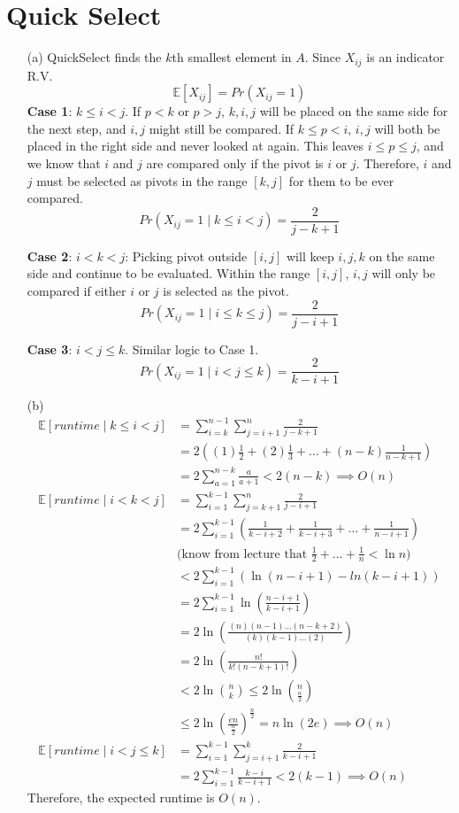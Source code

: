 \documentclass[11pt]{article}
\theoremstyle{definition}
\theoremstyle{remark}
\begin{document}
\section{Quick Select}
\begin{enumerate}
\item[(a)] QuickSelect finds the $k$th smallest element in $A$. Since $X_{ij}$ is an indicator R.V.
\[
\mathbb{E}[X_{ij}] = Pr(X_{ij} = 1)
\]
\textbf{Case 1}: $k \leq i < j$. If $p < k$ or $p > j$, $k, i, j$ will be placed on the same side for the next step, and $i,j$ might still be compared. If $k \leq p < i$, $i, j$ will both be placed in the right side and never looked at again. This leaves $i\leq p \leq j$, and we know that $i$ and $j$ are compared only if the pivot is $i$ or $j$. Therefore, $i$ and $j$ must be selected as pivots in the range $[k,j]$ for them to be ever compared.
\[
Pr(X_{ij} = 1 \mid k \leq i < j) = \frac{2}{j-k+1}
\]


\textbf{Case 2}: $i < k < j$: Picking pivot outside $[i,j]$ will keep $i,j,k$ on the same side and continue to be evaluated. Within the range $[i,j]$, $i,j$ will only be compared if either $i$ or $j$ is selected as the pivot.
\[
Pr(X_{ij} = 1 \mid i \leq k \leq j) = \frac{2}{j-i+1}
\]

\textbf{Case 3}: $i < j \leq k$. Similar logic to Case 1.
\[
Pr(X_{ij} = 1 \mid i < j \leq k) = \frac{2}{k-i+1}
\]
\clearpage
\item[(b)]
\begin{align*}
\mathbb{E}[runtime \mid k \leq i<j] &= \sum_{i=k}^{n-1}\sum_{j=i+1}^n \frac{2}{j-k+1} \\
&= 2\left((1)\frac{1}{2} + (2)\frac{1}{3} + \dots + (n-k)\frac{1}{n-k+1}\right) \\
&= 2 \sum_{a=1}^{n-k} \frac{a}{a+1} < 2(n-k) \implies O(n)\\
\mathbb{E}[runtime \mid i < k < j] &= \sum_{i=1}^{k-1}\sum_{j=k+1}^{n} \frac{2}{j-i+1} \\
&= 2 \sum_{i=1}^{k-1} \left(\frac{1}{k-i+2}+\frac{1}{k-i+3}+\dots+\frac{1}{n-i+1}     \right) \\
&\text{(know from lecture that $\frac{1}{2}+\dots+\frac{1}{n} < \ln n$)} \\
&< 2 \sum_{i=1}^{k-1} \left( \ln(n-i+1) - ln(k-i+1)   \right) \\
&= 2 \sum_{i=1}^{k-1} \ln\left( \frac{n-i+1}{k-i+1}   \right) \\
&= 2 \ln\left(\frac{(n)(n-1)\dots(n-k+2)}{(k)(k-1)\dots(2)}    \right) \\
&= 2 \ln\left(\frac{n!}{k!(n-k+1)!}\right) \\
&< 2 \ln\binom{n}{k} \leq 2 \ln \binom{n}{\frac{n}{2}} \\
&\leq 2 \ln \left(\frac{en}{\frac{n}{2}}\right)^{\frac{n}{2}} = n \ln (2e) \implies O(n) \\
\mathbb{E}[runtime \mid i < j \leq k] &= \sum_{i=1}^{k-1}\sum_{j=i+1}^{k}\frac{2}{k-i+1} \\
&= 2 \sum_{i=1}^{k-1} \frac{k-i}{k-i+1} < 2(k-1) \implies O(n)
\end{align*}
Therefore, the expected runtime is $O(n)$.
\end{enumerate}
\clearpage
\end{document}
